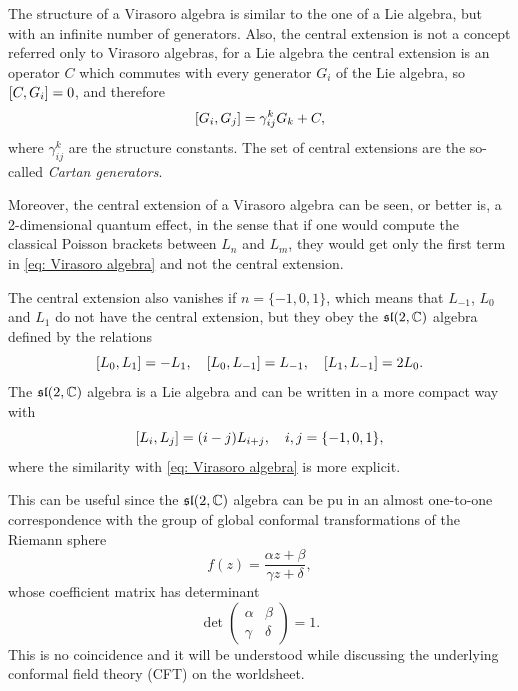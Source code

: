 \begin{obs}
    The structure of a Virasoro algebra is similar to the one of a Lie algebra, but with an infinite number of generators. Also, the central extension is not a concept referred only to Virasoro algebras, for a Lie algebra the central extension is an operator $C$ which commutes with every generator $G_i$ of the Lie algebra, so $[C,G_i] = 0$, and therefore 
    \begin{equation}
        [G_i,G_j] = \gamma_{ij}^kG_k + C,
    \end{equation}
    where $\gamma_{ij}^k$ are the structure constants. The set of central extensions are the so-called \emph{Cartan generators}.

    Moreover, the central extension of a Virasoro algebra can be seen, or better is, a 2-dimensional quantum effect, in the sense that if one would compute the classical Poisson brackets between $L_n$ and $L_m$, they would get only the first term in \eqref{eq: Virasoro algebra} and not the central extension. 
\end{obs}
The central extension also vanishes if $n = \{-1,0,1\}$, which means that $L_{-1}$, $L_0$ and $L_1$ do not have the central extension, but they obey the $\mathfrak{sl}(2,\mathbb{C})$ algebra defined by the relations
\begin{equation}
    [L_0,L_1] = -L_1,\quad [L_0,L_{-1}] = L_{-1},\quad [L_1,L_{-1}] = 2L_0.
\end{equation}
The $\mathfrak{sl}(2,\mathbb{C})$ algebra is a Lie algebra and can be written in a more compact way with 
\begin{equation}
    [L_i,L_j] = (i - j)L_{i + j},\quad i,j = \{-1,0,1\},
\end{equation}
where the similarity with \eqref{eq: Virasoro algebra} is more explicit. 
\begin{obs}
    This can be useful since the $\mathfrak{sl}(2,\mathbb{C})$ algebra can be pu in an almost one-to-one correspondence with the group of global conformal transformations of the Riemann sphere 
    \begin{equation}
        f(z) = \frac{\alpha z + \beta}{\gamma z + \delta},
    \end{equation}
    whose coefficient matrix has determinant
    \begin{equation}
        \det{
            \begin{pmatrix}
                \alpha & \beta \\
                \gamma & \delta
            \end{pmatrix}
        } = 1.
    \end{equation}
    This is no coincidence and it will be understood while discussing the underlying conformal field theory (CFT) on the worldsheet.
\end{obs}
